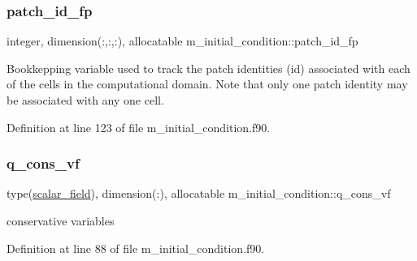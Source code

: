 \mbox{\label{namespacem__initial__condition_a0014f6589f0b33ea2372c1d4b7f0c824}} 
\subsubsection{\texorpdfstring{patch\+\_\+id\+\_\+fp}{patch\_id\_fp}}
{\footnotesize\ttfamily integer, dimension(\+:,\+:,\+:), allocatable m\+\_\+initial\+\_\+condition\+::patch\+\_\+id\+\_\+fp}



Bookkepping variable used to track the patch identities (id) associated with each of the cells in the computational domain. Note that only one patch identity may be associated with any one cell. 



Definition at line 123 of file m\+\_\+initial\+\_\+condition.\+f90.

\mbox{\label{namespacem__initial__condition_a1f42c68f3b3d167616d52b7cf7a7d56a}} 
\subsubsection{\texorpdfstring{q\+\_\+cons\+\_\+vf}{q\_cons\_vf}}
{\footnotesize\ttfamily type(\hyperlink{structm__derived__types_1_1scalar__field}{scalar\+\_\+field}), dimension(\+:), allocatable m\+\_\+initial\+\_\+condition\+::q\+\_\+cons\+\_\+vf}



conservative variables 



Definition at line 88 of file m\+\_\+initial\+\_\+condition.\+f90.

\mbox{\label{namespacem__initial__condition_ad9935d4b9c2f6a7af08f3630681d0c1a}} 
